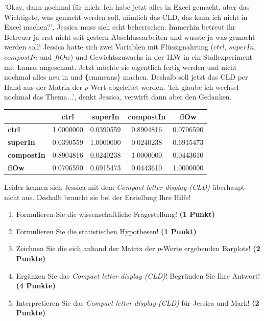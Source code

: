 \documentclass[a4paper, 9pt]{scrartcl}\usepackage[]{graphicx}\usepackage[]{xcolor}
\newenvironment{knitrout}{}{} %
\begin{document}
'Okay, dann nochmal für mich. Ich habe jetzt alles in Excel gemacht, aber das Wichtigste, was gemacht werden soll, nämlich das CLD, das kann ich nicht in Excel machen?', Jessica muss sich echt beherrschen. Immerhin betreut ihr Betreuer ja erst nicht seit gestern Abschlussarbeiten und wusste ja was gemacht werden soll! Jessica hatte sich zwei Variablen mit Flüssignahrung ($ctrl$, $superIn$, $compostIn$ und $flOw$) und Gewichtszuwachs in der 1LW in ein Stallexperiment mit Lamas angeschaut. Jetzt möchte sie eigentlich fertig werden und nicht nochmal alles neu in \Rlogo und \texttt\{emmeans\} machen. Deshalb soll jetzt das CLD per Hand aus der Matrix der $p$-Wert abgeleitet werden. 'Ich glaube ich wechsel nochmal das Thema...', denkt Jessica, verwirft dann aber den Gedanken.

\begin{knitrout}
\color{fgcolor}\begin{table}[!h]
\centering\begingroup\fontsize{10}{12}\selectfont

\begin{tabular}{>{}lcccc}
\toprule
\textbf{ } & \textbf{ctrl} & \textbf{superIn} & \textbf{compostIn} & \textbf{flOw}\\
\midrule
\textbf{ctrl} & 1.0000000 & 0.0390559 & 0.8904816 & 0.0706590\\
\textbf{superIn} & 0.0390559 & 1.0000000 & 0.0240238 & 0.6915473\\
\textbf{compostIn} & 0.8904816 & 0.0240238 & 1.0000000 & 0.0443610\\
\textbf{flOw} & 0.0706590 & 0.6915473 & 0.0443610 & 1.0000000\\
\bottomrule
\end{tabular}
\endgroup{}
\end{table}

\end{knitrout}

Leider kennen sich Jessica mit dem \textit{Compact letter display (CLD)} überhaupt nicht aus. Deshalb braucht sie bei der Erstellung Ihre Hilfe!

\begin{enumerate}
  \item Formulieren Sie die wissenschaftliche Fragestellung! \textbf{(1 Punkt)}
  \item Formulieren Sie die statistischen Hypothesen! \textbf{(1 Punkt)}
\item Zeichnen Sie die sich anhand der Matrix der $p$-Werte ergebenden Barplots! \textbf{(2 Punkte)}
\item Ergänzen Sie das \textit{Compact letter display (CLD)}! Begründen Sie Ihre Antwort! \textbf{(4 Punkte)}
\item Interpretieren Sie das \textit{Compact letter display (CLD)} für Jessica und Mark! \textbf{(2 Punkte)} 
\end{enumerate}
\end{document}

